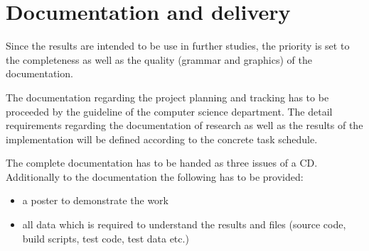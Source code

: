 \section*{Documentation and delivery}

Since the results are intended to be use in further studies, the priority is set
to the completeness as well as the quality (grammar and graphics) of the
documentation.

The documentation regarding the project planning and tracking has to be
proceeded by the guideline of the computer science department. The detail
requirements regarding the documentation of research as well as the results of
the implementation will be defined according to the concrete task schedule.

The complete documentation has to be handed as three issues of a CD.
Additionally to the documentation the following has to be provided:

\begin{itemize}
    \item a poster to demonstrate the work
    \item all data which is required to understand the results and files (source
      code, build scripts, test code, test data etc.)
\end{itemize}

